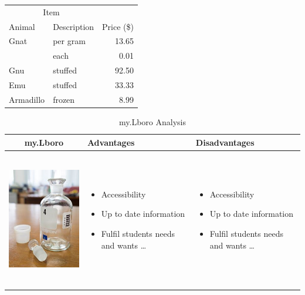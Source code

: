 \documentclass{article}
\begin{document}
\begin{tabular}{llr}
\hline
\multicolumn{2}{c}{Item} \\
\cline{1-2}
Animal    & Description & Price (\$) \\
\hline
Gnat      & per gram    & 13.65      \\
          & each        & 0.01       \\
Gnu       & stuffed     & 92.50      \\
Emu       & stuffed     & 33.33      \\
Armadillo & frozen      & 8.99       \\
\hline
\end{tabular}

\begin{table}[h!]
  \centering
  \begin{tabular}{ | c | m{5cm} | m{5cm} | }
    \hline
    my.Lboro & Advantages & Disadvantages \\ \hline
    \begin{minipage}{.3\textwidth}
      \includegraphics[width=\linewidth, height=60mm]{LaboratoryBODBottlePicture}
    \end{minipage}
    &
      \begin{itemize}
        \item Accessibility
        \item Up to date information
        \item Fulfil students needs and wants \ldots
      \end{itemize}
    & 
      \begin{itemize}
        \item Accessibility
        \item Up to date information
        \item Fulfil students needs and wants \ldots
      \end{itemize}
    \\ \hline
  \end{tabular}
  \caption{my.Lboro Analysis}\label{tbl:myLboro}
\end{table}
\end{document}
